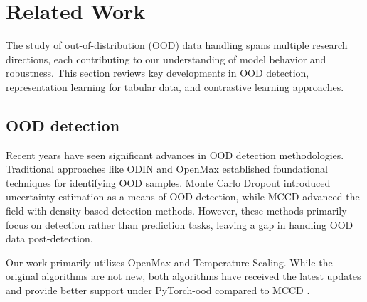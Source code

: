 \section{Related Work}
The study of out-of-distribution (OOD) data handling spans multiple research directions, each contributing to our understanding of model behavior and robustness. This section reviews key developments in OOD detection, representation learning for tabular data, and contrastive learning approaches.
\subsection{OOD detection}


Recent years have seen significant advances in OOD detection methodologies. Traditional approaches like ODIN \citep{Liang2017} and OpenMax \citep{Bendale2016} established foundational techniques for identifying OOD samples. Monte Carlo Dropout \citep{Gal2016}introduced uncertainty estimation as a means of OOD detection, while MCCD \citep{Lee2020} advanced the field with density-based detection methods. However, these methods primarily focus on detection rather than prediction tasks, leaving a gap in handling OOD data post-detection.

Our work primarily utilizes OpenMax and Temperature Scaling. While the original algorithms are not new, both algorithms have received the latest updates and provide better support under PyTorch-ood \citep{kirchheim2022pytorch} compared to MCCD \citep{deepMCCD}.

